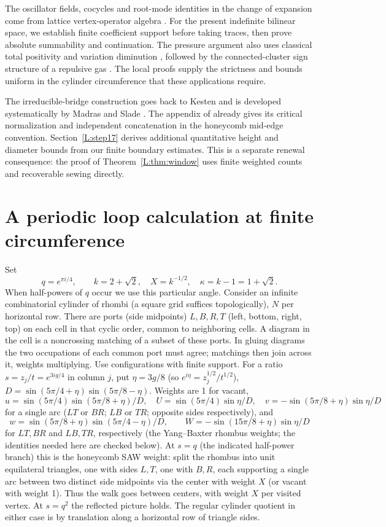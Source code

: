 \documentclass[11pt]{article}
\numberwithin{equation}{section}
\theoremstyle{definition}\newtheorem{definition}[theorem]{Definition}
\theoremstyle{remark}\newtheorem{remark}[theorem]{Remark}
\begin{document}
The oscillator fields, cocycles and root-mode identities in the change
of expansion come from lattice vertex-operator algebra
\cite[Section~2.1]{Frenkel1985}. For the present indefinite bilinear
space, we establish finite coefficient support before taking traces,
then prove absolute summability and continuation. The pressure argument
also uses classical total positivity and variation diminution
\cite{Schoenberg1947}, followed by the connected-cluster sign structure
of a repulsive gas \cite[Sections~2.2--2.3]{ScottSokal2005}.
The local proofs supply the strictness and bounds uniform in the
cylinder circumference that these applications require.

The irreducible-bridge construction goes back to Kesten and is developed
systematically by Madras and Slade
\cite{Kesten1963,MadrasSlade1993}. The appendix of
\cite{BeatonEtAl2014} already gives its critical normalization and
independent concatenation in the honeycomb mid-edge convention.
Section~\ref{L:step17} derives additional quantitative height and diameter
bounds from our finite boundary estimates. This is a separate renewal
consequence: the proof of Theorem~\ref{L:thm:window} uses finite weighted
counts and recoverable sewing directly.

\tableofcontents
\section{A periodic loop calculation at finite circumference}\label{L:part1}

Set
\[
 q=e^{\pi i/4},\qquad k=2+\sqrt2,\quad X=k^{-1/2},
 \quad \kappa=k-1=1+\sqrt2 .
\]
When half-powers of \(q\) occur we use this particular angle. Consider an infinite combinatorial cylinder of rhombi (a square grid suffices topologically), \(N\) per horizontal row. There are ports (side midpoints) \(L,B,R,T\) (left, bottom, right, top) on each cell in that cyclic order, common to neighboring cells. A diagram in the cell is a noncrossing matching of a subset of these ports. In gluing diagrams the two occupations of each common port must agree; matchings then join across it, weights multiplying. Use configurations with finite support. For a ratio \(s=z_j/t=e^{3ig/4}\) in column \(j\), put \(\eta=3g/8\) (so \(e^{i\eta}=z_j^{1/2}/t^{1/2}\)), \(D=\sin(5\pi/4+\eta)\sin(5\pi/8-\eta)\). Weights are 1 for vacant,
\[
 u=\sin(5\pi/4)\sin(5\pi/8+\eta)/D,\quad
 U=\sin(5\pi/4)\sin\eta/D,\quad
 v=-\sin(5\pi/8+\eta)\sin\eta/D
\]
for a single arc (\(LT\) or \(BR\); \(LB\) or \(TR\); opposite sides respectively), and
\[
 w=\sin(5\pi/8+\eta)\sin(5\pi/4-\eta)/D,\qquad
 W=-\sin(15\pi/8+\eta)\sin\eta/D
\]
for \(LT,BR\) and \(LB,TR\), respectively (the Yang--Baxter rhombus weights; the identities needed here are checked below). At \(s=q\) (the indicated half-power branch) this is the honeycomb SAW weight: split the rhombus into unit equilateral triangles, one with sides \(L,T\), one with \(B,R\), each supporting a single arc between two distinct side midpoints via the center with weight \(X\) (or vacant with weight 1). Thus the walk goes between centers, with weight \(X\) per visited vertex. At \(s=q^2\) the reflected picture holds. The regular cylinder quotient in either case is by translation along a horizontal row of triangle sides. \cite{GlazmanManolescu2017}
\end{document}

